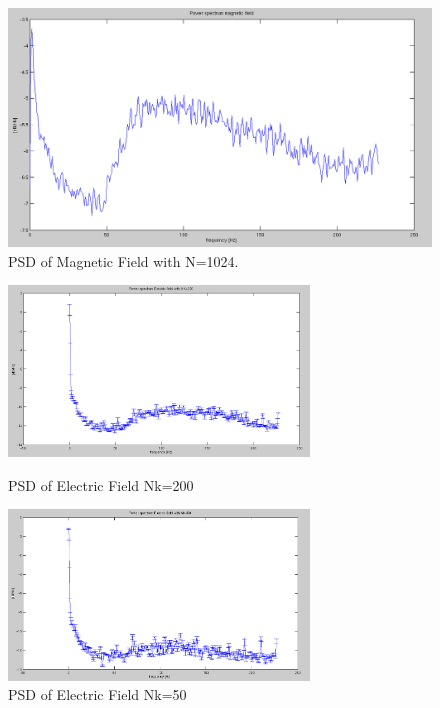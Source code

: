 \documentclass{article}
\begin{document}
\begin{figure}[htb!]
\centering
\includegraphics[width=\textwidth]{Figures/PSD_magnetic.png}
\caption{PSD of Magnetic Field with N=1024.}
\label{fig:PSD_magnetic}
\end{figure}

\begin{figure}[htb!]
\begin{minipage}[c]{0.5\linewidth}
\centering
\includegraphics[width=8cm]{Figures/PSD_electric_200.png}
\caption{PSD of Electric Field Nk=200}
\label{fig:PSD_electric_200}
\end{minipage}
\hspace{0.1cm}
\begin{minipage}[c]{0.5\linewidth}
\centering
\includegraphics[width=8cm]{Figures/PSD_electric_50.png}
\caption{PSD of Electric Field Nk=50}
\label{fig:PSD_electric_50}
\end{minipage}
\end{figure}
\end{document}
